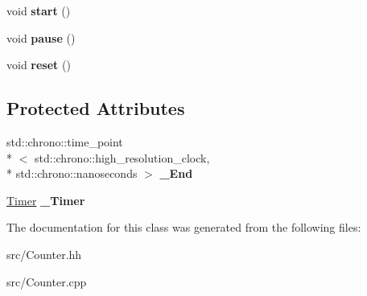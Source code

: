 \begin{DoxyCompactItemize}
\item 
\hypertarget{classstb_1_1Counter_ae8bf3a7285cf8c150581154a4c8bf494}{void {\bfseries start} ()}\label{classstb_1_1Counter_ae8bf3a7285cf8c150581154a4c8bf494}

\item 
\hypertarget{classstb_1_1Counter_a228982f92aa6169e87298d0788aaeaa5}{void {\bfseries pause} ()}\label{classstb_1_1Counter_a228982f92aa6169e87298d0788aaeaa5}

\item 
\hypertarget{classstb_1_1Counter_a4a1d17f5245e475ce657fd88a4a9dcfd}{void {\bfseries reset} ()}\label{classstb_1_1Counter_a4a1d17f5245e475ce657fd88a4a9dcfd}

\end{DoxyCompactItemize}
\subsection*{Protected Attributes}
\begin{DoxyCompactItemize}
\item 
\hypertarget{classstb_1_1Counter_a774b46357bab8c5409e3272316e7d32d}{std\+::chrono\+::time\+\_\+point\\*
$<$ std\+::chrono\+::high\+\_\+resolution\+\_\+clock, \\*
std\+::chrono\+::nanoseconds $>$ {\bfseries \+\_\+\+End}}\label{classstb_1_1Counter_a774b46357bab8c5409e3272316e7d32d}

\item 
\hypertarget{classstb_1_1Counter_a4bb7cd82ee049ecbcd0e9e895d76d95b}{\hyperlink{classstb_1_1Timer}{Timer} {\bfseries \+\_\+\+Timer}}\label{classstb_1_1Counter_a4bb7cd82ee049ecbcd0e9e895d76d95b}

\end{DoxyCompactItemize}


The documentation for this class was generated from the following files\+:\begin{DoxyCompactItemize}
\item 
src/Counter.\+hh\item 
src/Counter.\+cpp\end{DoxyCompactItemize}
